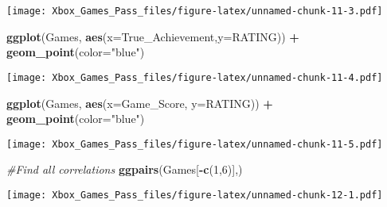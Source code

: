 \documentclass[
]{article}
\newenvironment{Shaded}{\begin{snugshade}}{\end{snugshade}}
\newcommand{\CommentTok}[1]{\textcolor[rgb]{0.56,0.35,0.01}{\textit{#1}}}
\newcommand{\DataTypeTok}[1]{\textcolor[rgb]{0.13,0.29,0.53}{#1}}
\newcommand{\DecValTok}[1]{\textcolor[rgb]{0.00,0.00,0.81}{#1}}
\newcommand{\FloatTok}[1]{\textcolor[rgb]{0.00,0.00,0.81}{#1}}
\newcommand{\KeywordTok}[1]{\textcolor[rgb]{0.13,0.29,0.53}{\textbf{#1}}}
\newcommand{\NormalTok}[1]{#1}
\newcommand{\OperatorTok}[1]{\textcolor[rgb]{0.81,0.36,0.00}{\textbf{#1}}}
\newcommand{\OtherTok}[1]{\textcolor[rgb]{0.56,0.35,0.01}{#1}}
\newcommand{\StringTok}[1]{\textcolor[rgb]{0.31,0.60,0.02}{#1}}
\begin{document}
\texttt{[image: Xbox\_Games\_Pass\_files/figure-latex/unnamed-chunk-11-3.pdf]}

\begin{Shaded}
\begin{Highlighting}[]
\KeywordTok{ggplot}\NormalTok{(Games, }\KeywordTok{aes}\NormalTok{(}\DataTypeTok{x=}\NormalTok{True_Achievement,}\DataTypeTok{y=}\NormalTok{RATING)) }\OperatorTok{+}\StringTok{ }\KeywordTok{geom_point}\NormalTok{(}\DataTypeTok{color=}\StringTok{"blue"}\NormalTok{)}
\end{Highlighting}
\end{Shaded}

\texttt{[image: Xbox\_Games\_Pass\_files/figure-latex/unnamed-chunk-11-4.pdf]}

\begin{Shaded}
\begin{Highlighting}[]
\KeywordTok{ggplot}\NormalTok{(Games, }\KeywordTok{aes}\NormalTok{(}\DataTypeTok{x=}\NormalTok{Game_Score, }\DataTypeTok{y=}\NormalTok{RATING)) }\OperatorTok{+}\StringTok{ }\KeywordTok{geom_point}\NormalTok{(}\DataTypeTok{color=}\StringTok{"blue"}\NormalTok{)}
\end{Highlighting}
\end{Shaded}

\texttt{[image: Xbox\_Games\_Pass\_files/figure-latex/unnamed-chunk-11-5.pdf]}

\begin{Shaded}
\begin{Highlighting}[]
\CommentTok{#Find all correlations}
\KeywordTok{ggpairs}\NormalTok{(Games[}\OperatorTok{-}\KeywordTok{c}\NormalTok{(}\DecValTok{1}\NormalTok{,}\DecValTok{6}\NormalTok{)],)}
\end{Highlighting}
\end{Shaded}

\texttt{[image: Xbox\_Games\_Pass\_files/figure-latex/unnamed-chunk-12-1.pdf]}

\begin{Shaded}
\end{Shaded}
\end{document}
